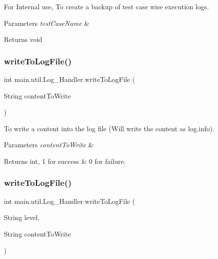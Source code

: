 For Internal use, To create a backup of test case wise execution logs. 
\begin{DoxyParams}{Parameters}
{\em test\+Case\+Name} & \\
\hline
\end{DoxyParams}
\begin{DoxyReturn}{Returns}
void 
\end{DoxyReturn}
\mbox{\label{classmain_1_1util_1_1_log___handler_ab3b7d1c5620a36a1183aa1db40146f1f}} 
\subsubsection{\texorpdfstring{write\+To\+Log\+File()}{writeToLogFile()}\hspace{0.1cm}{\footnotesize\ttfamily [1/2]}}
{\footnotesize\ttfamily int main.\+util.\+Log\+\_\+\+Handler.\+write\+To\+Log\+File (\begin{DoxyParamCaption}\item[{String}]{content\+To\+Write }\end{DoxyParamCaption})}

To write a content into the log file (Will write the content as log.\+info). 
\begin{DoxyParams}{Parameters}
{\em content\+To\+Write} & \\
\hline
\end{DoxyParams}
\begin{DoxyReturn}{Returns}
int, 1 for success \& 0 for failure. 
\end{DoxyReturn}
\mbox{\label{classmain_1_1util_1_1_log___handler_a77c07bc8ee96f3bef8948d2e4efa90f8}} 
\subsubsection{\texorpdfstring{write\+To\+Log\+File()}{writeToLogFile()}\hspace{0.1cm}{\footnotesize\ttfamily [2/2]}}
{\footnotesize\ttfamily int main.\+util.\+Log\+\_\+\+Handler.\+write\+To\+Log\+File (\begin{DoxyParamCaption}\item[{String}]{level,  }\item[{String}]{content\+To\+Write }\end{DoxyParamCaption})}

